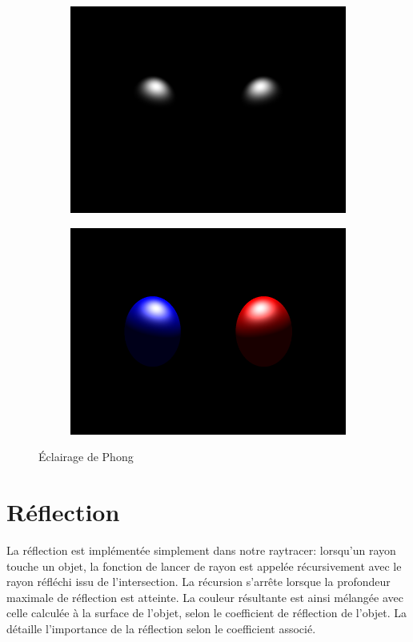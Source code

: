 \documentclass{article}
\begin{document}
\begin{figure}[hb]
  \begin{subfigure}{0.45\textwidth}
    \includegraphics[width=1\textwidth]{images/phong3.png}
  \end{subfigure}
  \begin{subfigure}{0.45\textwidth}
    \includegraphics[width=1\textwidth]{images/phong4.png}
  \end{subfigure}
  \caption{Éclairage de Phong\label{phong}}
\end{figure}


\section{Réflection}
La réflection est implémentée simplement dans notre raytracer: lorsqu'un rayon
touche un objet, la fonction de lancer de rayon est appelée récursivement avec
le rayon réfléchi issu de l'intersection. La récursion s'arrête lorsque la
profondeur maximale de réflection est atteinte. La couleur résultante est ainsi
mélangée avec celle calculée à la surface de l'objet, selon le coefficient de
réflection de l'objet. La \label{refl} détaille l'importance de la
réflection selon le coefficient associé.
\end{document}
